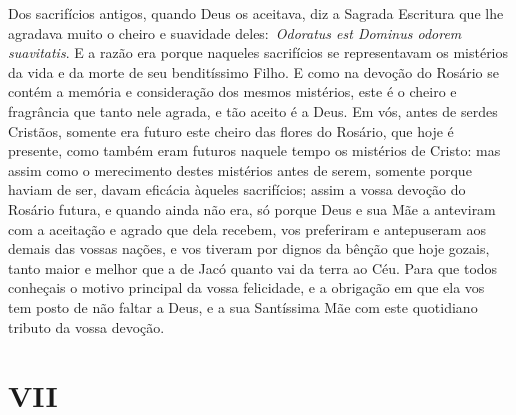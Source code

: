 Dos sacrifícios antigos, quando Deus os aceitava, diz a
Sagrada Escritura que lhe agradava muito o cheiro e suavidade
deles:~\emph{Odoratus est Dominus odorem suavitatis}.
E a razão era porque naqueles sacrifícios se representavam os mistérios
da vida e da morte de seu benditíssimo Filho. E como na devoção do
Rosário se contém a memória e consideração dos mesmos mistérios, este é
o cheiro e fragrância que tanto nele agrada, e tão aceito é a Deus. Em
vós, antes de serdes Cristãos, somente era futuro este cheiro das flores
do Rosário, que hoje é presente, como também eram futuros naquele tempo
os mistérios de Cristo: mas assim como o merecimento destes mistérios
antes de serem, somente porque haviam de ser, davam eficácia àqueles
sacrifícios; assim a vossa devoção do Rosário futura, e quando ainda não
era, só porque Deus e sua Mãe a anteviram com a aceitação e agrado que
dela recebem, vos preferiram e antepuseram aos demais das vossas nações,
e vos tiveram por dignos da bênção que hoje gozais, tanto maior e melhor
que a de Jacó quanto vai da terra ao Céu. Para que todos conheçais o
motivo principal da vossa felicidade, e a obrigação em que ela vos tem
posto de não faltar a Deus, e a sua Santíssima Mãe com este quotidiano
tributo da vossa devoção.


\section*{VII}

